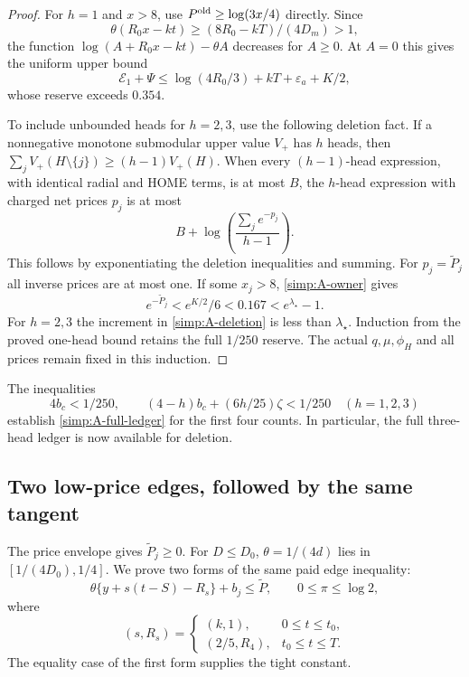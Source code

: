 \begin{proof}
For $h=1$ and $x>8$, use $P^{\rm old}\ge\log(3x/4)$ directly.
Since
\[
 \theta(R_0x-kt)\ge(8R_0-kT)/(4D_m)>1,
\]
the function $\log(A+R_0x-kt)-\theta A$ decreases for $A\ge0$.
At $A=0$ this gives the uniform upper bound
\[
 \mathcal E_1+\Psi\le\log(4R_0/3)+kT+\varepsilon_a+K/2,
\]
whose reserve exceeds $0.354$.

To include unbounded heads for $h=2,3$, use the following deletion
fact.  If a nonnegative monotone submodular upper value $V_+$ has $h$
heads, then
$\sum_jV_+(H\setminus\{j\})\ge(h-1)V_+(H)$.
When every $(h-1)$-head expression, with identical radial and HOME
terms, is at most $B$, the $h$-head expression with charged net prices
$p_j$ is at most
\begin{equation}\label{simp:A-deletion}
 B+\log\left(\frac{\sum_j e^{-p_j}}{h-1}\right).
\end{equation}
This follows by exponentiating the deletion inequalities and summing.
For $p_j=\widetilde P_j$ all inverse prices are at most one.
If some $x_j>8$, \eqref{simp:A-owner} gives
\[
 e^{-\widetilde P_j}<e^{K/2}/6<0.167<e^{\lambda_\star}-1.
\]
For $h=2,3$ the increment in \eqref{simp:A-deletion} is less than
$\lambda_\star$.  Induction from the proved one-head bound retains
the full $1/250$ reserve.  The actual $q,\mu,\phi_H$ and all prices
remain fixed in this induction.
\end{proof}

The inequalities
\[
 4b_c<1/250,\qquad
 (4-h)b_c+(6h/25)\zeta<1/250\quad(h=1,2,3)
\]
establish \eqref{simp:A-full-ledger} for the first four counts.
In particular, the full three-head ledger is now available for deletion.

\subsection{Two low-price edges, followed by the same tangent}

The price envelope gives $\widetilde P_j\ge0$.
For $D\le D_0$, $\theta=1/(4d)$ lies in $[1/(4D_0),1/4]$.
We prove two forms of the same paid edge inequality:
\begin{equation}\label{simp:A-paid-edge}
 \theta\{y+s(t-S)-R_s\}+b_j\le\widetilde P,
 \qquad 0\le\pi\le\log2,
\end{equation}
where
\[
 (s,R_s)=
 \begin{cases}(k,1),&0\le t\le t_0,\\
 (2/5,R_4),&t_0\le t\le T.
 \end{cases}
\]
The equality case of the first form supplies the tight constant.

